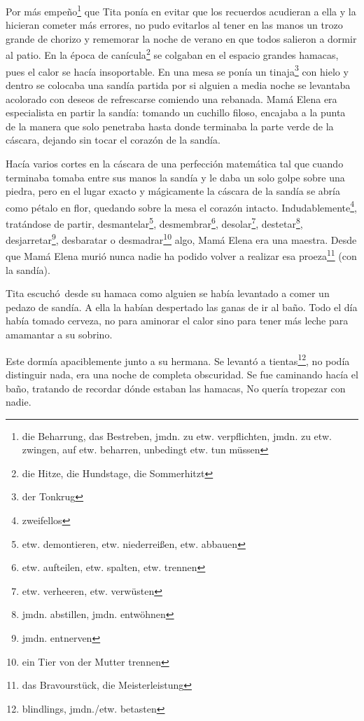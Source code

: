 Por más empeño\footnote{die Beharrung, das Bestreben, jmdn. zu etw. verpflichten, jmdn. zu etw. zwingen, auf etw. beharren, unbedingt etw. tun müssen}
que Tita ponía en evitar que los recuerdos acudieran a
ella y la hicieran cometer más errores, no pudo evitarlos al tener en
las manos un trozo grande de chorizo y rememorar la noche de verano en
que todos salieron a dormir al patio. En la época de canícula\footnote{die Hitze, die Hundstage, die Sommerhitzt} se
colgaban en el espacio grandes hamacas, pues el calor se hacía
insoportable. En una mesa se ponía un tinaja\footnote{der Tonkrug}
con hielo y dentro se colocaba una sandía partida por si alguien a media
noche se levantaba acolorado con deseos de refrescarse comiendo una
rebanada.
Mamá Elena era especialista en partir la sandía: tomando un cuchillo filoso,
encajaba a la punta de la manera que solo penetraba hasta donde
terminaba la parte verde de la cáscara, dejando sin tocar el corazón de
la sandía.

Hacía varios cortes en la cáscara de una perfección matemática tal que
cuando terminaba tomaba entre sus manos la sandía y le daba un solo
golpe sobre una piedra, pero en el lugar exacto y mágicamente la cáscara
de la sandía se abría como pétalo en flor, quedando sobre la mesa el
corazón intacto. Indudablemente\footnote{zweifellos},
tratándose de partir, desmantelar\footnote{etw. demontieren, etw. niederreißen, etw. abbauen}, desmembrar\footnote{etw. aufteilen, etw. spalten, etw. trennen}, desolar\footnote{etw. verheeren, etw. verwüsten}, destetar\footnote{jmdn. abstillen, jmdn. entwöhnen}, desjarretar\footnote{jmdn. entnerven},
desbaratar o desmadrar\footnote{ein Tier von der Mutter trennen} algo,
Mamá Elena era una maestra. Desde que Mamá Elena murió nunca nadie ha
podido volver a realizar esa proeza\footnote{das Bravourstück, die Meisterleistung}
(con la sandía).

Tita escuchó~desde su hamaca como alguien se había levantado a
comer un pedazo de sandía. A ella la habían despertado las ganas de ir
al baño. Todo el día había tomado cerveza, no para aminorar
el calor sino para tener más leche para amamantar a su sobrino.

Este dormía apaciblemente junto
a su hermana. Se levantó a tientas\footnote{blindlings, jmdn./etw. betasten},
no podía distinguir nada, era una noche de completa obscuridad. Se fue
caminando hacía el baño, tratando de recordar dónde estaban las hamacas,
No quería tropezar con nadie.

